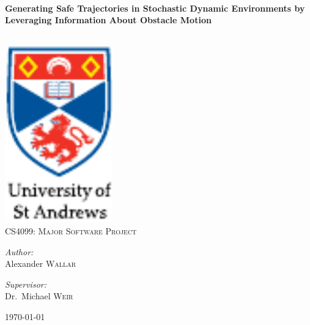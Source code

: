 
\begin{titlepage}

\begin{center}

\HRule \\[0.4cm]
{\huge \bfseries Generating Safe Trajectories in Stochastic Dynamic
    Environments by Leveraging Information About Obstacle Motion
\\[0.4cm] }

\HRule \\[3cm]


\includegraphics[width=0.35\textwidth]{figs/st-andrews-logo}~\\[1cm]

\textsc{\Large CS4099: Major Software Project}\\[1cm]

\noindent

\begin{minipage}{0.3\textwidth}

\begin{center} \large

\emph{Author:}\\

Alexander \textsc{Wallar}

\end{center}

\end{minipage}%
\begin{minipage}{0.3\textwidth}

\begin{center} \large

\emph{Supervisor:} \\

Dr.~Michael \textsc{Weir}

\end{center}

\end{minipage}%

\vfill

{\large \today}

\end{center}

\end{titlepage}
